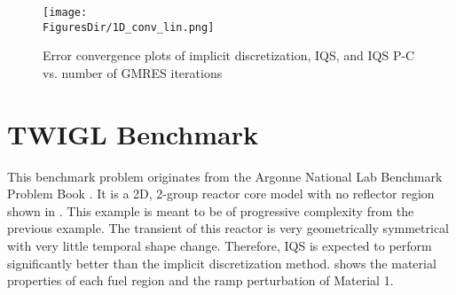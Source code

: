 \begin{figure}[!htbp]
\begin{center}
\texttt{[image: \\FiguresDir/1D\_conv\_lin.png]}
\caption{Error convergence plots of implicit discretization, IQS, and IQS P-C vs. number of GMRES iterations}
\label{fig:1D_conv_lin}
\end{center}
\end{figure}

\pagebreak
\section{TWIGL Benchmark}

This benchmark problem originates from the Argonne National Lab Benchmark Problem Book \cite{ANL_BPB}.  It is a 2D, 2-group reactor core model with no reflector region shown in  \cite{TWIGL_benchmark}.  This example is meant to be of progressive complexity from the previous example.  The transient of this reactor is very geometrically symmetrical with very little temporal shape change.  Therefore, IQS is expected to perform significantly better than the implicit discretization method.   shows the material properties of each fuel region and the ramp perturbation of Material 1.

